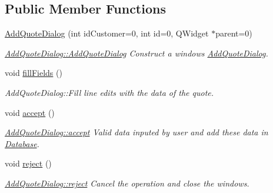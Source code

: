 \subsection*{Public Member Functions}
\begin{DoxyCompactItemize}
\item 
\hyperlink{classAddQuoteDialog_abffc6ab5550345bf6cfa57d0a4f2b8b4}{Add\+Quote\+Dialog} (int id\+Customer=0, int id=0, Q\+Widget $\ast$parent=0)
\begin{DoxyCompactList}\small\item\em \hyperlink{classAddQuoteDialog_abffc6ab5550345bf6cfa57d0a4f2b8b4}{Add\+Quote\+Dialog\+::\+Add\+Quote\+Dialog} Construct a windows \hyperlink{classAddQuoteDialog}{Add\+Quote\+Dialog}. \end{DoxyCompactList}\item 
\hypertarget{classAddQuoteDialog_ae9ad47fdc3babc6546ed3708873c0d05}{void \hyperlink{classAddQuoteDialog_ae9ad47fdc3babc6546ed3708873c0d05}{fill\+Fields} ()}\label{classAddQuoteDialog_ae9ad47fdc3babc6546ed3708873c0d05}

\begin{DoxyCompactList}\small\item\em Add\+Quote\+Dialog\+::\+Fill line edits with the data of the quote. \end{DoxyCompactList}\item 
\hypertarget{classAddQuoteDialog_a5926a2d7b00ddc3f623b34ee4489277f}{void \hyperlink{classAddQuoteDialog_a5926a2d7b00ddc3f623b34ee4489277f}{accept} ()}\label{classAddQuoteDialog_a5926a2d7b00ddc3f623b34ee4489277f}

\begin{DoxyCompactList}\small\item\em \hyperlink{classAddQuoteDialog_a5926a2d7b00ddc3f623b34ee4489277f}{Add\+Quote\+Dialog\+::accept} Valid data inputed by user and add these data in \hyperlink{classDatabase}{Database}. \end{DoxyCompactList}\item 
\hypertarget{classAddQuoteDialog_a8d639a263877c3bb10bda6ece25f0234}{void \hyperlink{classAddQuoteDialog_a8d639a263877c3bb10bda6ece25f0234}{reject} ()}\label{classAddQuoteDialog_a8d639a263877c3bb10bda6ece25f0234}

\begin{DoxyCompactList}\small\item\em \hyperlink{classAddQuoteDialog_a8d639a263877c3bb10bda6ece25f0234}{Add\+Quote\+Dialog\+::reject} Cancel the operation and close the windows. \end{DoxyCompactList}\end{DoxyCompactItemize}


